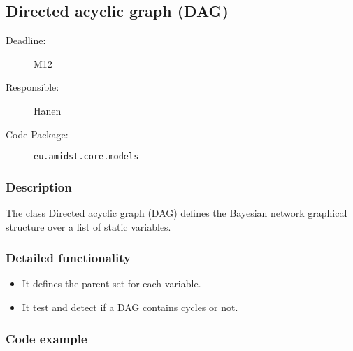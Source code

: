\newpage
\subsection{Directed acyclic graph (DAG)}
\label{DAG:ID}

\begin{description}
\item[Deadline:] M12
\item[Responsible:] Hanen
\item[Code-Package:] \texttt{eu.amidst.core.models}
\end{description}

\subsubsection*{Description}

The class Directed acyclic graph (DAG) defines the Bayesian network graphical structure over a list of static variables.

\subsubsection*{Detailed functionality}

\begin{itemize}
\item It defines the parent set for each variable.
\item It test and detect if a DAG contains cycles or not.
\end{itemize}

\subsubsection*{Code example}

